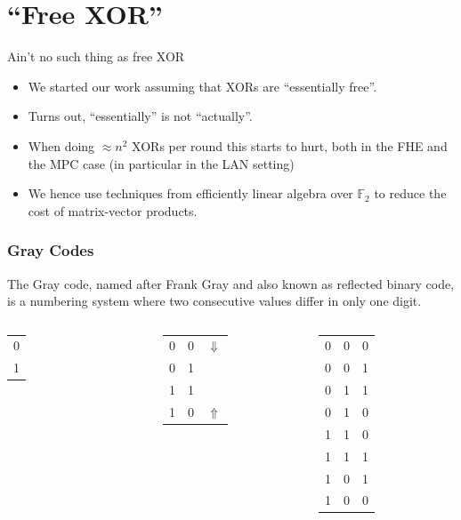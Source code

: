 \documentclass[10pt,compress]{beamer}
\newcommand{\F}{\mathbb{F}}
\begin{document}
\section{``Free XOR''}

\begin{frame}{Ain't no such thing as free XOR}
  \begin{itemize}
  \item We started our work assuming that XORs are ``essentially free''.
  \item Turns out, ``essentially'' is not ``actually''.
  \item When doing $\approx n^2$ XORs per round this starts to hurt, both in the FHE and the MPC case (in particular in the LAN setting)
  \item We hence use techniques from efficiently linear algebra over $\F_2$ to reduce the cost of matrix-vector products.
  \end{itemize}
\end{frame}


\begin{frame}
\frametitle{Gray Codes}

The Gray code, named after Frank Gray and also known as reflected binary code, is a numbering system where two consecutive values differ in only one digit.
 
\begin{columns}
\begin{tabular}{c}
0\\
1\\
\end{tabular}

\begin{tabular}{ccc}
0 & \alert{0} & $\Downarrow$\\
0 & \alert{1} & \\
1 & 1 & \\
1 & 0 & $\Uparrow$\\
\end{tabular}

\begin{tabular}{ccc}
0 & \alert{0} & \alert{0}\\
0 & \alert{0} & \alert{1}\\
0 & \alert{1} & \alert{1}\\
0 & \alert{1} & \alert{0}\\
1 & 1 & 0\\
1 & 1 & 1\\
1 & 0 & 1\\
1 & 0 & 0\\
\end{tabular}
\end{columns}

\end{frame}
\end{document}
